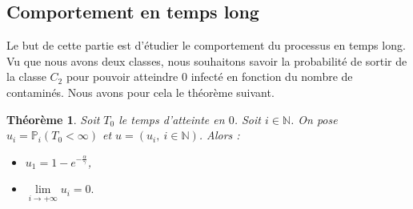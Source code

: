\documentclass[12pt,a4paper]{report}
\newtheorem{thm}{Théorème}[section]
\theoremstyle{remark}
\begin{document}
\subsection{Comportement en temps long}
\vspace{0.6cm}

Le but de cette partie est d'étudier le comportement du processus en temps long. Vu que nous avons deux classes, nous souhaitons savoir la probabilité de sortir de la classe $C_2$ pour pouvoir atteindre $0$ infecté en fonction du nombre de contaminés. Nous avons pour cela le théorème suivant.

\begin{thm}
Soit $T_0$ le temps d'atteinte en $0$. Soit $i \in \mathbb{N}$. On pose $u_i=\mathbb{P}_i(T_0< \infty)$ et $u=(u_i,\  i\in \mathbb{N})$. Alors :
\begin{itemize}
    \item $u_1 = 1 - e^{-\frac{\alpha}{\gamma}}$,
    \item $\lim\limits_{i \rightarrow +\infty} u_i = 0.$
\end{itemize}
\end{thm}
\end{document}
